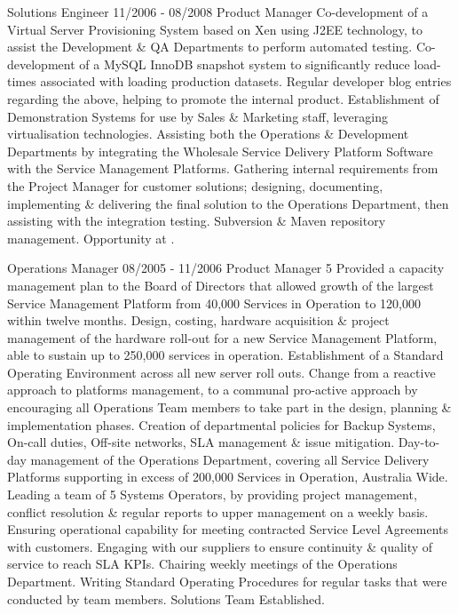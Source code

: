 \lskip
{} Solutions Engineer
 11/2006 - 08/2008
 Product Manager
 Co-development of a Virtual Server Provisioning System based on Xen using J2EE technology, to assist the Development \& QA Departments to perform automated testing.
\dashtopic Co-development of a MySQL InnoDB snapshot system to significantly reduce load-times associated with loading production datasets.
\dashtopic Regular developer blog entries regarding the above, helping to promote the internal product.
\dashtopic Establishment of Demonstration Systems for use by Sales \& Marketing staff, leveraging virtualisation technologies.
 Assisting both the Operations \& Development Departments by integrating the Wholesale Service Delivery Platform Software with the Service Management Platforms.
\dashtopic Gathering internal requirements from the Project Manager for customer solutions; designing, documenting, implementing \& delivering the final solution to the Operations Department, then assisting with the integration testing.
\dashtopic Subversion \& Maven repository management.
 Opportunity at \ATL.
\pskip

 Operations Manager
\lskip
{} 08/2005 - 11/2006
 Product Manager
 5
 Provided a capacity management plan to the Board of Directors that allowed growth of the largest Service Management Platform from 40,000 Services in Operation to 120,000 within twelve months.
\dashtopic Design, costing, hardware acquisition \& project management of the hardware roll-out for a new Service Management Platform, able to sustain up to 250,000 services in operation.
\dashtopic Establishment of a Standard Operating Environment across all new server roll outs.
\dashtopic Change from a reactive approach to platforms management, to a communal pro-active approach by encouraging all Operations Team members to take part in the design, planning \& implementation phases.
\dashtopic Creation of departmental policies for Backup Systems, On-call duties, Off-site networks, SLA management \& issue mitigation.
 Day-to-day management of the Operations Department, covering all Service Delivery Platforms supporting in excess of 200,000 Services in Operation, Australia Wide.
\dashtopic Leading a team of 5 Systems Operators, by providing project management, conflict resolution \& regular reports to upper management on a weekly basis.
\dashtopic Ensuring operational capability for meeting contracted Service Level Agreements with customers.
\dashtopic Engaging with our suppliers to ensure continuity \& quality of service to reach SLA KPIs.
\dashtopic Chairing weekly meetings of the Operations Department.
\dashtopic Writing Standard Operating Procedures for regular tasks that were conducted by team members.
 Solutions Team Established.
\pskip

